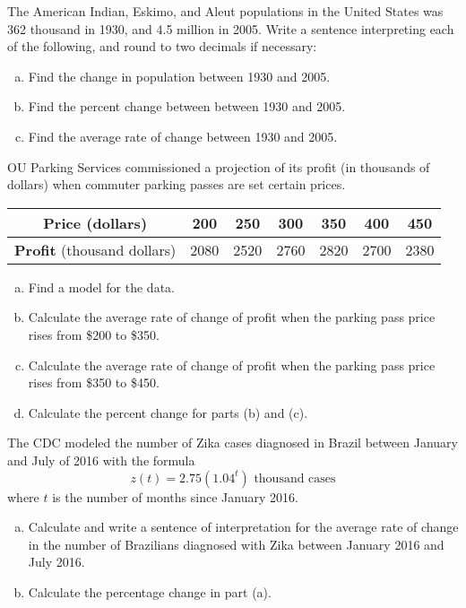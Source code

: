 \documentclass[notes]{subfiles}
\begin{document}
		\begin{ex}
			The American Indian, Eskimo, and Aleut populations in the United States was 362 thousand in 1930, and 4.5 million in 2005.  Write a sentence interpreting each of the following, and round to two decimals if necessary:
			\begin{enumerate}[(a)]
				\item Find the change in population between 1930 and 2005.	
				\item Find the percent change between between 1930 and 2005.
				\item Find the average rate of change between 1930 and 2005.
			\end{enumerate}
		\end{ex}
				\newpage
				
		\begin{ex}
			OU Parking Services commissioned a projection of its profit (in thousands of dollars) when commuter parking passes are set certain prices.
				\begin{center}
					{\renewcommand{\arraystretch}{1.2}
					\begin{tabular}{|c|c|c|c|c|c|c|}\hline
						\textbf{Price} (dollars) & 200 & 250 & 300 & 350 & 400 & 450\\ \hline
						\textbf{Profit} (thousand dollars) & 2080 & 2520 & 2760 & 2820 & 2700 & 2380\\ \hline				
					\end{tabular}
					}
				\end{center}	
				\begin{enumerate}[(a)]
					\item Find a model for the data.
						\vs{1.5}
					\item Calculate the average rate of change of profit when the parking pass price rises from \$200 to \$350.
						\vs{1}
					\item Calculate the average rate of change of profit when the parking pass price rises from \$350 to \$450.
						\vs{1}
						
					\item Calculate the percent change for parts (b) and (c).
						\vs{1}
						
				\end{enumerate}
		\end{ex}	
			\newpage
			
		\begin{ex}
			The CDC modeled the number of Zika cases diagnosed in Brazil between January and July of 2016 with the formula
				\[z(t) = 2.75(1.04^t)\text{ thousand cases}\]
				where $t$ is the number of months since January 2016.
			\begin{enumerate}[(a)]
				\item Calculate and write a sentence of interpretation for the average rate of change in the number of Brazilians diagnosed with Zika between January 2016 and July 2016.
					
				\item Calculate the percentage change in part (a).
			\end{enumerate}
		\end{ex}
			\newpage
		
\end{document}

